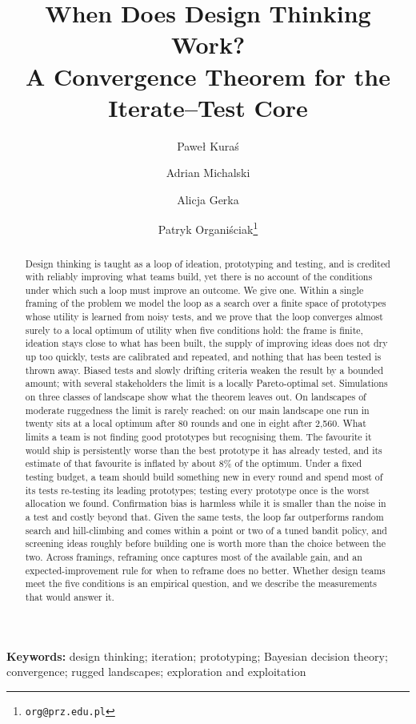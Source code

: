 \documentclass[10pt,twocolumn]{article}
\title{\textbf{When Does Design Thinking Work?\\A Convergence Theorem for the Iterate--Test Core}}
\author[1]{Paweł Kuraś}
\author[2]{Adrian Michalski}
\author[3]{Alicja Gerka}
\author[3]{Patryk Organiściak\thanks{\texttt{org@prz.edu.pl}}}
\affil[1]{Institute of Telecommunications, AGH University of Science and Technology, Kraków, Poland}
\affil[2]{Faculty of Mathematics and Applied Sciences, Rzeszów University of Technology, Rzeszów, Poland}
\affil[3]{Department of Complex Systems, Rzeszów University of Technology, Rzeszów, Poland}
\date{}
\theoremstyle{definition}
\begin{document}
\maketitle

\begin{abstract}
\noindent Design thinking is taught as a loop of ideation, prototyping and testing, and is credited with reliably improving what teams build, yet there is no account of the conditions under which such a loop must improve an outcome. We give one. Within a single framing of the problem we model the loop as a search over a finite space of prototypes whose utility is learned from noisy tests, and we prove that the loop converges almost surely to a local optimum of utility when five conditions hold: the frame is finite, ideation stays close to what has been built, the supply of improving ideas does not dry up too quickly, tests are calibrated and repeated, and nothing that has been tested is thrown away. Biased tests and slowly drifting criteria weaken the result by a bounded amount; with several stakeholders the limit is a locally Pareto-optimal set. Simulations on three classes of landscape show what the theorem leaves out. On landscapes of moderate ruggedness the limit is rarely reached: on our main landscape one run in twenty sits at a local optimum after 80 rounds and one in eight after 2{,}560. What limits a team is not finding good prototypes but recognising them. The favourite it would ship is persistently worse than the best prototype it has already tested, and its estimate of that favourite is inflated by about 8\% of the optimum. Under a fixed testing budget, a team should build something new in every round and spend most of its tests re-testing its leading prototypes; testing every prototype once is the worst allocation we found. Confirmation bias is harmless while it is smaller than the noise in a test and costly beyond that. Given the same tests, the loop far outperforms random search and hill-climbing and comes within a point or two of a tuned bandit policy, and screening ideas roughly before building one is worth more than the choice between the two. Across framings, reframing once captures most of the available gain, and an expected-improvement rule for when to reframe does no better. Whether design teams meet the five conditions is an empirical question, and we describe the measurements that would answer it.
\end{abstract}

\vspace{0.4em}
\noindent\textbf{Keywords:} design thinking; iteration; prototyping; Bayesian decision theory; convergence; rugged landscapes; exploration and exploitation
\end{document}
